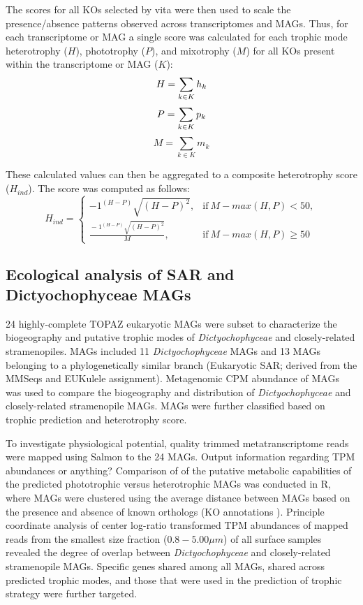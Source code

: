 \documentclass[12pt]{article}
\numberwithin{equation}{section}
\begin{document}
The scores for all KOs selected by vita were then used to scale the presence/absence patterns observed across transcriptomes and MAGs. Thus, for each transcriptome or MAG a single score was calculated for each trophic mode heterotrophy ($H$), phototrophy ($P$), and mixotrophy ($M$) for all KOs present within the transcriptome or MAG ($K$):
  \begin{equation}\label{eq:sum}
  H = \sum_{k \in K} h_k \\ 
  \end{equation}
  \begin{equation}
    P = \sum_{k \in K} p_k \\
\end{equation}
  \begin{equation}
    M = \sum_{k \in K} m_k
\end{equation}

These calculated values can then be aggregated to a composite heterotrophy score ($H_{ind}$). The score was computed as follows: 
\begin{equation}\label{eq:hind}
  H_{ind}=
    \begin{cases}
      -1^{(H-P)}\sqrt{(H-P)^2}, & \text{if}\ M-max(H,P)<50, \\
      \frac{{}-1^{(H-P)}\sqrt{(H-P)^2}}{M}, & \text{if} \ M-max(H,P) \geq 50
    \end{cases}
  \end{equation}
  
\subsection*{Ecological analysis of SAR and Dictyochophyceae MAGs}
24 highly-complete TOPAZ eukaryotic MAGs were subset to characterize the biogeography and putative trophic modes of \emph{Dictyochophyceae} and closely-related stramenopiles. MAGs included 11 \emph{Dictyochophyceae} MAGs and 13 MAGs belonging to a phylogenetically similar branch (Eukaryotic SAR; derived from the MMSeqs and EUKulele assignment). Metagenomic CPM abundance of MAGs was used to compare the biogeography and distribution of \emph{Dictyochophyceae} and closely-related stramenopile MAGs. MAGs were further classified based on trophic prediction and heterotrophy score. 

To investigate physiological potential, quality trimmed metatranscriptome reads were mapped using Salmon \cite{Patro2017Salmon} to the 24 MAGs. Output information regarding TPM abundances or anything? Comparison of of the putative metabolic capabilities of the predicted phototrophic versus heterotrophic MAGs was conducted in R, where MAGs were clustered using the average distance between MAGs based on the presence and absence of known orthologs (KO annotations \citep{Kanehisa_2019}). Principle coordinate analysis of center log-ratio transformed TPM abundances of mapped reads from the smallest size fraction ($0.8 - 5.00 \mu m$) of all surface samples revealed the degree of overlap between \emph{Dictyochophyceae} and closely-related stramenopile MAGs. Specific genes shared among all MAGs, shared across predicted trophic modes, and those that were used in the prediction of trophic strategy \citep{} were further targeted.
\end{document}
